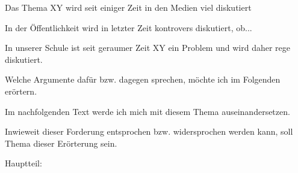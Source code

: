 \begin{compactitem}

    \item Das Thema XY wird seit einiger Zeit in den Medien viel diskutiert 
    \item  In der Öffentlichkeit wird in letzter Zeit kontrovers diskutiert, ob... 
    \item  In unserer Schule ist seit geraumer Zeit XY ein Problem und wird daher rege diskutiert. 
    \item Welche Argumente dafür bzw. dagegen sprechen, möchte ich im Folgenden erörtern. 
    \item Im nachfolgenden Text werde ich mich mit diesem Thema auseinandersetzen. 
    \item Inwieweit dieser Forderung entsprochen bzw. widersprochen werden kann, soll Thema dieser Erörterung sein. 
\end{compactitem}
Hauptteil: 
